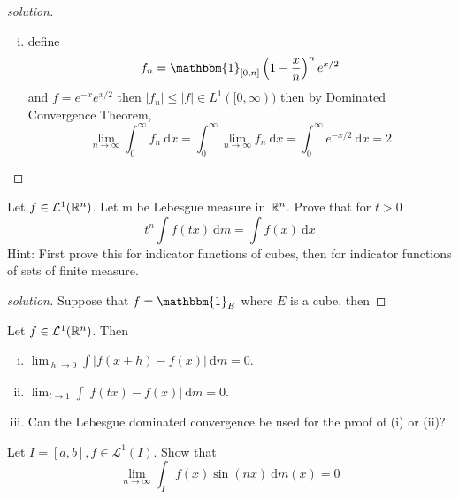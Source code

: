 \begin{proof}[solution]
   \begin{enumerate}[(i)]
    \item define \[f_n = \mathbbm{1}_{[0, n]} \left(1 - \frac xn\right)^n e^{x/2}\]
    and $f = e^{-x}e^{x/2}$
    then $|f_n| \le |f| \in L^1([0, \infty))$ then by Dominated Convergence Theorem,
    \[\lim_{n\to\infty}\int_{0}^\infty f_n\ \mathrm{d}x = \int_{0}^\infty\lim_{n\to\infty} f_n\ \mathrm{d}x = \int_0^\infty e^{-x/2}\ \mathrm{d}x = 2\]
   \end{enumerate}
\end{proof}

\begin{problem}
  Let $f \in \mathcal{L}^1(\mathbb R^n)$. Let m be Lebesgue measure in $\mathbb R^n$. Prove that for $t > 0$
  \[t^n \int f(tx)\ \mathrm{d}m = \int f(x)\ \mathrm{d}x\]
Hint: First prove this for indicator functions of cubes, then for indicator
functions of sets of finite measure.
\end{problem}

\begin{proof}[solution]
  Suppose that $f = \mathbbm{1}_E$ where $E$ is a cube, then
  
\end{proof}

\begin{problem}
  Let $f \in \mathcal{L}^1(\mathbb R^n)$. Then
  \begin{enumerate}[(i)]
    \item $\lim_{|h| \to 0} \int |f(x+h) - f(x)|\ \mathrm{d}m = 0$.
    \item $\lim_{t \to 1} \int |f(tx) - f(x)|\ \mathrm{d}m = 0$.
    \item Can the Lebesgue dominated convergence be used for the proof of (i) or (ii)?
  \end{enumerate}
\end{problem}

\begin{problem}
  Let $I = [a, b], f \in \mathcal{L}^1(I)$. Show that
  \[\lim_{n\to\infty} \int_I f(x)\sin(nx)\ \mathrm{d}m(x) = 0\]
\end{problem}

